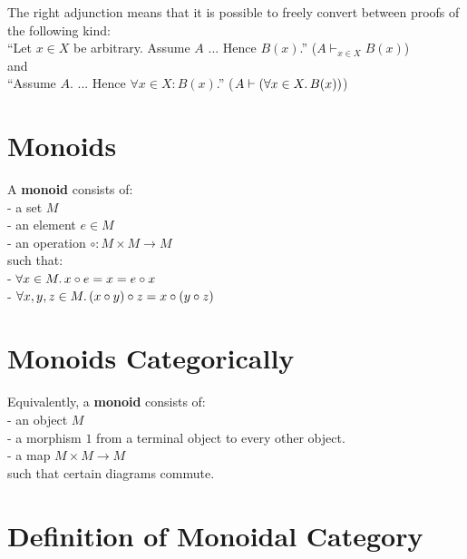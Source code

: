\documentclass[a4paper, twoside, english, 11pt]{book}
\begin{document}
\noindent
The right adjunction means that it is possible to freely convert between proofs of the following kind: \\

``Let $x \in X$ be arbitrary. Assume $A$ ... Hence $B(x)$.'' ($A \vdash_{x \in X} B(x)$) \\

\noindent
and \\

``Assume $A$. ... Hence $\forall x \in X : B(x)$.'' ($A \vdash (\forall x \in X \ldotp B(x))$)



\section{Monoids}

A \textbf{monoid} consists of: \\

- a set $M$ \\

- an element $e \in M$ \\

- an operation $\circ : M \times M \rightarrow M$ \\

\noindent
such that: \\

- $\forall x \in M \ldotp x \circ e = x = e \circ x$ \\

- $\forall x, y, z \in M \ldotp (x \circ y) \circ z = x \circ (y \circ z)$



\section{Monoids Categorically}

Equivalently, a \textbf{monoid} consists of: \\

- an object $M$ \\

- a morphism $1$ from a terminal object to every other object. \\ %

- a map $M \times M \rightarrow M$ \\

such that certain diagrams commute.



\section{Definition of Monoidal Category}
\end{document}
